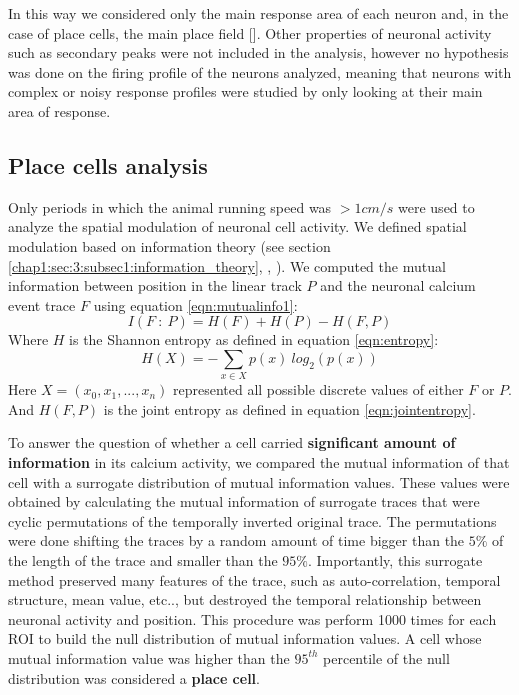 In this way we considered only the main response area of each neuron and, in the case of place cells, the main place field [\cite{turi2019vasoactive}].
Other properties of neuronal activity such as secondary peaks were not included in the analysis, however no hypothesis was done on the firing profile of the neurons analyzed, meaning that neurons with complex or noisy response profiles were studied by only looking at their main area of response.
\subsection{Place cells analysis}
\label{chap3:sec:7:subsec2:pc_analysis}
Only periods in which the animal running speed was $> 1 cm/s$ were used to analyze the spatial modulation of neuronal cell activity. 
We defined spatial modulation based on information theory (see section \ref{chap1:sec:3:subsec1:information_theory}, \cite{shannon1948}, \cite{quirogapanzeri2013}). 
We computed the mutual information between position in the linear track $P$ and the neuronal calcium event trace $F$ using equation \ref{eqn:mutualinfo1}:
\begin{equation}
\label{eqn:mutualinfoPF}
    I(F\ :\ P) = H(F)+H(P)-H(F , P)
\end{equation}
Where $H$ is the Shannon entropy as defined in equation \ref{eqn:entropy}:
\begin{equation}
    H(X)= -\sum_{x\in X}p(x)\ log_2(p(x))
\end{equation}
Here $X = (x_0, x_1, ... , x_n)$ represented all possible discrete values of either $F$ or $P$.
And $H(F,P)$ is the joint entropy as defined in equation \ref{eqn:jointentropy}.

To answer the question of whether a cell carried \textbf{significant amount of information} in its calcium activity, we compared the mutual information of that cell with a surrogate distribution of mutual information values. 
These values were obtained by calculating the mutual information of surrogate traces that were cyclic permutations of the temporally inverted original trace.
The permutations were done shifting the traces by a random amount of time bigger than the $5\%$ of the length of the trace and smaller than the $95\%$.
Importantly, this surrogate method preserved many features of the trace, such as auto-correlation, temporal structure, mean value, etc.., but destroyed the temporal relationship between neuronal activity and position.  
This procedure was perform 1000 times for each ROI to build the null distribution of mutual information values.
A cell whose mutual information value was higher than the $95^{th}$ percentile of the null distribution was considered a \textbf{place cell}. 

